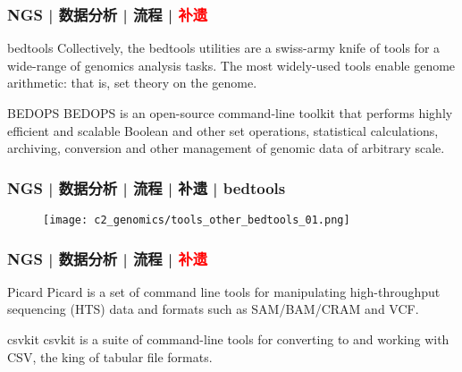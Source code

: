 \begin{frame}
  \frametitle{NGS | 数据分析 | 流程 | \textcolor{red}{补遗}}
  \begin{block}{bedtools}
    Collectively, the bedtools utilities are a swiss-army knife of tools for a wide-range of genomics analysis tasks. The most widely-used tools enable genome arithmetic: that is, set theory on the genome.
  \end{block}
  \pause
  \begin{block}{BEDOPS}
    BEDOPS is an open-source command-line toolkit that performs highly efficient and scalable Boolean and other set operations, statistical calculations, archiving, conversion and other management of genomic data of arbitrary scale.
  \end{block}
\end{frame}

\begin{frame}
  \frametitle{NGS | 数据分析 | 流程 | 补遗 | bedtools}
  \begin{figure}
    \centering
    \texttt{[image: c2\_genomics/tools\_other\_bedtools\_01.png]}
  \end{figure}
\end{frame}

\begin{frame}
  \frametitle{NGS | 数据分析 | 流程 | \textcolor{red}{补遗}}
  \begin{block}{Picard}
    Picard is a set of command line tools for manipulating high-throughput sequencing (HTS) data and formats such as SAM/BAM/CRAM and VCF.
  \end{block}
  \pause
  \begin{block}{csvkit}
    csvkit is a suite of command-line tools for converting to and working with CSV, the king of tabular file formats.
  \end{block}
\end{frame}

